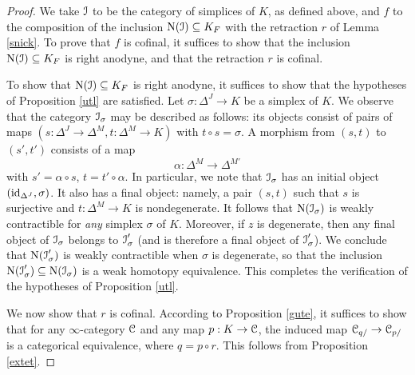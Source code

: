 \begin{proof}
We take $\operatorname{\mathcal{I}}$ to be the category of simplices of $K$, as defined
above, and $f$ to the composition of the inclusion $\operatorname{N}(\operatorname{\mathcal{I}})
\subseteq K_{F}$ with the retraction $r$ of Lemma \ref{snick}. 
To prove that $f$ is cofinal, it suffices to show that the inclusion
$\operatorname{N}(\operatorname{\mathcal{I}}) \subseteq K_{F}$ is right anodyne, and that the retraction $r$ is cofinal.

To show that $\operatorname{N}( \operatorname{\mathcal{I}}) \subseteq K_{F}$ is right anodyne, it suffices to show that the hypotheses of Proposition \ref{utl} are satisfied.  Let $\sigma: \Delta^J \rightarrow K$ be a simplex of $K$. We observe
that the category $\operatorname{\mathcal{I}}_{\sigma}$ may be described as follows: its
objects consist of pairs of maps $(s: \Delta^J \rightarrow
\Delta^{M}, t: \Delta^{M} \rightarrow K)$ with $t \circ s = \sigma$. A
morphism from $(s,t)$ to $(s',t')$ consists of a map
$$ \alpha: \Delta^M \rightarrow \Delta^{M'}$$
with $s' = \alpha \circ s$, $t = t' \circ \alpha$. In particular,
we note that $\operatorname{\mathcal{I}}_{\sigma}$ has an initial object $(\operatorname{id}_{\Delta^J},
\sigma)$. It also has a final object: namely, a pair $(s,t)$ such
that $s$ is surjective and $t: \Delta^M \rightarrow K$ is
nondegenerate. It follows that $\operatorname{N}(\operatorname{\mathcal{I}}_{\sigma})$ is weakly
contractible for {\em any} simplex $\sigma$ of $K$. Moreover, if $z$ is
degenerate, then any final object of $\operatorname{\mathcal{I}}_{\sigma}$ belongs to
$\operatorname{\mathcal{I}}'_{\sigma}$ (and is therefore a final object of $\operatorname{\mathcal{I}}'_{\sigma}$). We conclude that $\operatorname{N}(\operatorname{\mathcal{I}}'_{\sigma})$ is weakly contractible when $\sigma$ is
degenerate, so that the inclusion $\operatorname{N}(\operatorname{\mathcal{I}}'_{\sigma}) \subseteq
\operatorname{N}(\operatorname{\mathcal{I}}_{\sigma})$ is a weak homotopy equivalence. This completes the verification of the hypotheses of Proposition \ref{utl}.

We now show that $r$ is cofinal. According to Proposition \ref{gute}, it suffices to show that
for any $\infty$-category $\operatorname{\mathcal{C}}$ and any map $p: K \rightarrow \operatorname{\mathcal{C}}$, the induced map
$\operatorname{\mathcal{C}}_{q/} \rightarrow \operatorname{\mathcal{C}}_{p/}$ is a categorical equivalence, where $q = p \circ r$.
This follows from Proposition \ref{extet}.
\end{proof}

